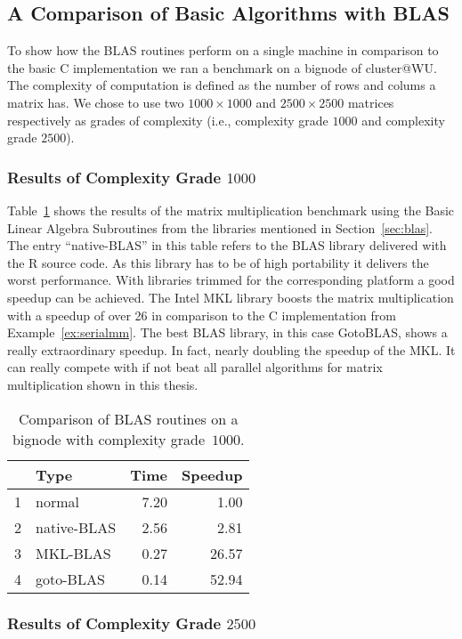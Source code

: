 


\subsection{A Comparison of Basic Algorithms with BLAS}

To show how the BLAS routines perform on a single machine in
comparison to the basic C implementation we ran a benchmark on a
bignode of cluster@WU. The complexity of computation is defined as the
number of rows and colums a matrix has. We chose to use two $1000
\times 1000$  and $2500 \times
2500$ matrices respectively as grades of complexity (i.e., complexity grade $1000$ and complexity grade $2500$).

\subsubsection{Results of Complexity Grade $1000$}

Table~\ref{tab:mm_seqsblas1000} shows the results of the matrix
multiplication benchmark using the Basic Linear Algebra Subroutines
from the libraries mentioned in Section~\ref{sec:blas}. The entry
``native-BLAS'' in this table refers to the BLAS library delivered
with the R source code. As this library has to be of high portability
it delivers the worst performance. With libraries trimmed for the
corresponding platform a good speedup can be achieved. The Intel MKL
library boosts the matrix multiplication with a speedup of over 26 in
comparison to the C implementation from Example~\ref{ex:serialmm}. The
best BLAS library, in 
this case GotoBLAS, shows a really extraordinary speedup. In fact,
nearly doubling the speedup of the MKL. It
can really compete with if not beat all parallel algorithms for matrix
multiplication shown in this thesis.

\begin{table}[ht]
\begin{center}
\begin{tabular}{rlrr}
  \hline
 & Type & Time & Speedup \\
  \hline
1 & normal & 7.20 & 1.00 \\
  2 & native-BLAS & 2.56 & 2.81 \\
  3 & MKL-BLAS & 0.27 & 26.57 \\
  4 & goto-BLAS & 0.14 & 52.94 \\
   \hline
\end{tabular}
\caption{Comparison of BLAS routines on a bignode with complexity grade~$1000$.}
\label{tab:mm_seqsblas1000}
\end{center}
\end{table}\subsubsection{Results of Complexity Grade $2500$}

